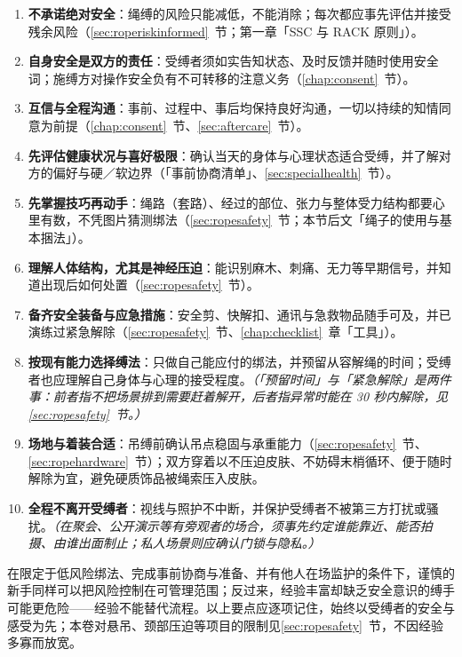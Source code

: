 \documentclass[12pt,UTF8]{ctexbook}
\begin{document}
\begin{enumerate}
\item \textbf{不承诺绝对安全}：绳缚的风险只能减低，不能消除；每次都应事先评估并接受残余风险（\ref{sec:roperiskinformed}~节；第一章「SSC 与 RACK 原则」）。
\item \textbf{自身安全是双方的责任}：受缚者须如实告知状态、及时反馈并随时使用安全词；施缚方对操作安全负有不可转移的注意义务（\ref{chap:consent}~节）。
\item \textbf{互信与全程沟通}：事前、过程中、事后均保持良好沟通，一切以持续的知情同意为前提（\ref{chap:consent}~节、\ref{sec:aftercare}~节）。
\item \textbf{先评估健康状况与喜好极限}：确认当天的身体与心理状态适合受缚，并了解对方的偏好与硬／软边界（「事前协商清单」、\ref{sec:specialhealth}~节）。
\item \textbf{先掌握技巧再动手}：绳路（套路）、经过的部位、张力与整体受力结构都要心里有数，不凭图片猜测绑法（\ref{sec:ropesafety}~节；本节后文「绳子的使用与基本捆法」）。
\item \textbf{理解人体结构，尤其是神经压迫}：能识别麻木、刺痛、无力等早期信号，并知道出现后如何处置（\ref{sec:ropesafety}~节）。
\item \textbf{备齐安全装备与应急措施}：安全剪、快解扣、通讯与急救物品随手可及，并已演练过紧急解除（\ref{sec:ropesafety}~节、\ref{chap:checklist}~章「工具」）。
\item \textbf{按现有能力选择缚法}：只做自己能应付的绑法，并预留从容解绳的时间；受缚者也应理解自己身体与心理的接受程度。\textit{（「预留时间」与「紧急解除」是两件事：前者指不把场景排到需要赶着解开，后者指异常时能在 30 秒内解除，见\ref{sec:ropesafety}~节。）}
\item \textbf{场地与着装合适}：吊缚前确认吊点稳固与承重能力（\ref{sec:ropesafety}~节、\ref{sec:ropehardware}~节）；双方穿着以不压迫皮肤、不妨碍末梢循环、便于随时解除为宜，避免硬质饰品被绳索压入皮肤。
\item \textbf{全程不离开受缚者}：视线与照护不中断，并保护受缚者不被第三方打扰或骚扰。\textit{（在聚会、公开演示等有旁观者的场合，须事先约定谁能靠近、能否拍摄、由谁出面制止；私人场景则应确认门锁与隐私。）}
\end{enumerate}

\begin{tcolorbox}[colback=pink!5!white,colframe=red!50!black,title=贴心小叮咛]
在限定于低风险绑法、完成事前协商与准备、并有他人在场监护的条件下，谨慎的新手同样可以把风险控制在可管理范围；反过来，经验丰富却缺乏安全意识的缚手可能更危险——经验不能替代流程。以上要点应逐项记住，始终以受缚者的安全与感受为先；本卷对悬吊、颈部压迫等项目的限制见\ref{sec:ropesafety}~节，不因经验多寡而放宽。
\end{tcolorbox}
\end{document}
